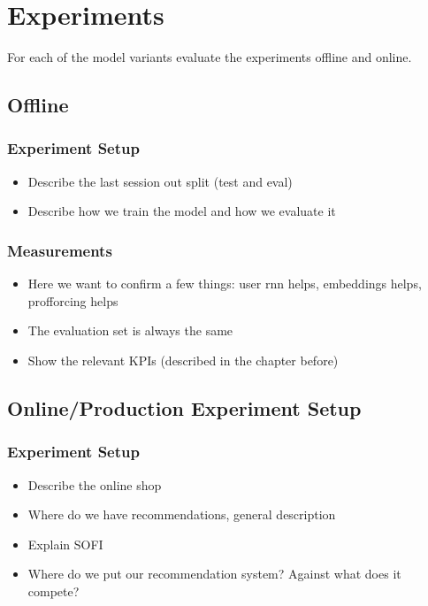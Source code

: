 \chapter{Experiments}
For each of the model variants evaluate the experiments offline and online.
\section{Offline}
\subsection{Experiment Setup}\label{exp_setup}
\begin{itemize}
    \item Describe the last session out split (test and eval)
    \item Describe how we train the model and how we evaluate it
\end{itemize}
\subsection{Measurements}
\begin{itemize}
    \item Here we want to confirm a few things: user rnn helps, embeddings helps, profforcing helps
    \item The evaluation set is always the same
    \item Show the relevant KPIs (described in the chapter before)
\end{itemize}

\section{Online/Production Experiment Setup}
\subsection{Experiment Setup}
\begin{itemize}
    \item Describe the online shop
    \item Where do we have recommendations, general description
    \item Explain SOFI
    \item Where do we put our recommendation system? Against what does it compete?
\end{itemize}
